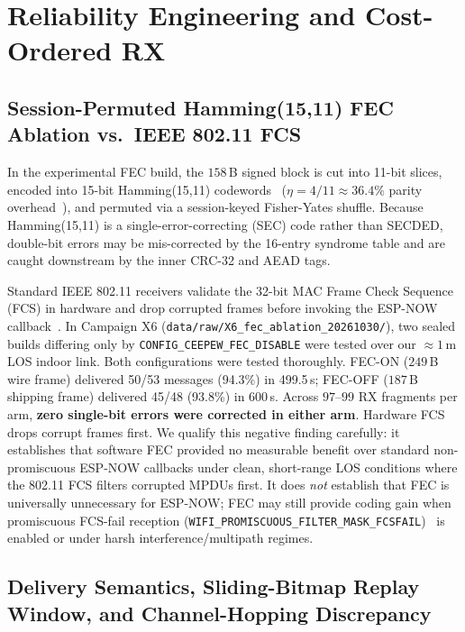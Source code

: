 \documentclass[conference]{IEEEtran}
\begin{document}
\section{Reliability Engineering and Cost-Ordered RX}

\subsection{Session-Permuted Hamming(15,11) FEC Ablation vs.\ IEEE 802.11 FCS}
In the experimental FEC build, the $158$\,B signed block is cut into 11-bit slices, encoded into 15-bit Hamming(15,11) codewords~\cite{hamming1950} ($\eta = 4/11 \approx 36.4\%$ parity overhead~\cite{lin2004}), and permuted via a session-keyed Fisher-Yates shuffle. Because Hamming(15,11) is a single-error-correcting (SEC) code rather than SECDED, double-bit errors may be mis-corrected by the 16-entry syndrome table and are caught downstream by the inner CRC-32 and AEAD tags.

Standard IEEE 802.11 receivers validate the 32-bit MAC Frame Check Sequence (FCS) in hardware and drop corrupted frames before invoking the ESP-NOW callback~\cite{yin2020}. In Campaign X6 (\texttt{data/raw/X6\_fec\_ablation\_20261030/}), two sealed builds differing only by \texttt{CONFIG\_CEEPEW\_FEC\_DISABLE} were tested over our $\approx 1$\,m LOS indoor link. Both configurations were tested thoroughly. FEC-ON ($249$\,B wire frame) delivered 50/53 messages (94.3\%) in 499.5\,s; FEC-OFF ($187$\,B shipping frame) delivered 45/48 (93.8\%) in 600\,s. Across $97$--$99$ RX fragments per arm, \textbf{zero single-bit errors were corrected in either arm}. Hardware FCS drops corrupt frames first. We qualify this negative finding carefully: it establishes that software FEC provided no measurable benefit over standard non-promiscuous ESP-NOW callbacks under clean, short-range LOS conditions where the 802.11 FCS filters corrupted MPDUs first. It does \emph{not} establish that FEC is universally unnecessary for ESP-NOW; FEC may still provide coding gain when promiscuous FCS-fail reception (\texttt{WIFI\_PROMISCUOUS\_FILTER\_MASK\_FCSFAIL})~\cite{yin2020} is enabled or under harsh interference/multipath regimes.

\subsection{Delivery Semantics, Sliding-Bitmap Replay Window, and Channel-Hopping Discrepancy}
\end{document}
